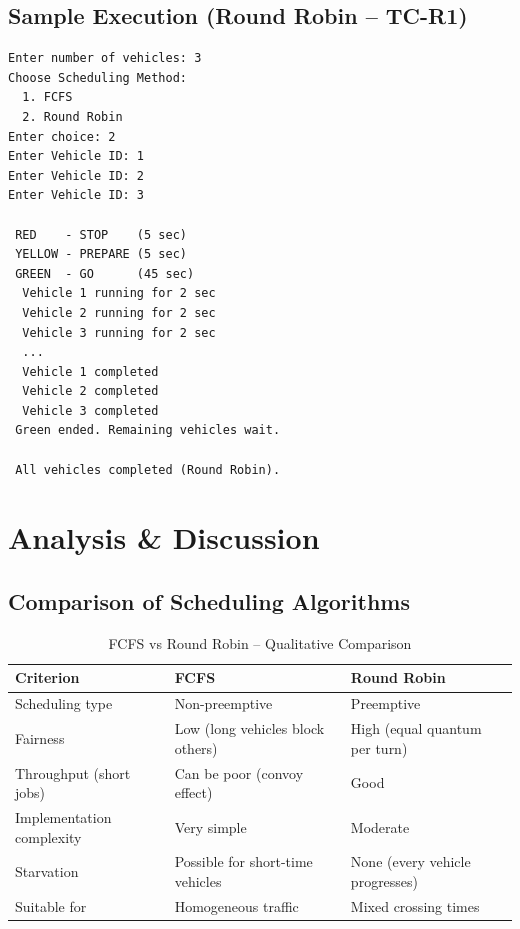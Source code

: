 \documentclass[12pt,a4paper]{article}
\begin{document}
\subsection{Sample Execution (Round Robin -- TC-R1)}

\begin{verbatim}
Enter number of vehicles: 3
Choose Scheduling Method:
  1. FCFS
  2. Round Robin
Enter choice: 2
Enter Vehicle ID: 1
Enter Vehicle ID: 2
Enter Vehicle ID: 3

 RED    - STOP    (5 sec)
 YELLOW - PREPARE (5 sec)
 GREEN  - GO      (45 sec)
  Vehicle 1 running for 2 sec
  Vehicle 2 running for 2 sec
  Vehicle 3 running for 2 sec
  ...
  Vehicle 1 completed
  Vehicle 2 completed
  Vehicle 3 completed
 Green ended. Remaining vehicles wait.

 All vehicles completed (Round Robin).
\end{verbatim}

\newpage

\section{Analysis \& Discussion}

\subsection{Comparison of Scheduling Algorithms}

\begin{table}[H]
\centering
\caption{FCFS vs Round Robin -- Qualitative Comparison}
\begin{tabular}{lll}
\toprule
\textbf{Criterion}           & \textbf{FCFS}                          & \textbf{Round Robin} \\
\midrule
Scheduling type              & Non-preemptive                         & Preemptive \\
Fairness                     & Low (long vehicles block others)       & High (equal quantum per turn) \\
Throughput (short jobs)      & Can be poor (convoy effect)            & Good \\
Implementation complexity    & Very simple                            & Moderate \\
Starvation                   & Possible for short-time vehicles       & None (every vehicle progresses) \\
Suitable for                 & Homogeneous traffic                    & Mixed crossing times \\
\bottomrule
\end{tabular}
\end{table}
\end{document}
